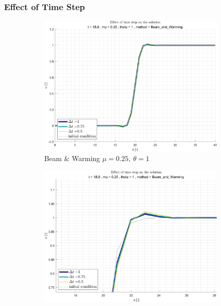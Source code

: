 \documentclass[11pt, a4paper]{article}
\begin{document}
\subsubsection{Effect of Time Step}
\begin{figure}[H]
    \centering
    \begin{subfigure}[c]{.38\textwidth}
        \centering
        \includegraphics[width=\textwidth]{images/grap12.png}
        \caption{Beam $\&$ Warming $\mu=0.25,\ \theta=1$}
        \label{fig:Beam & Warming_general_mu0.25_theta1_A_diff_time}
    \end{subfigure}
    \begin{subfigure}[c]{.38\textwidth}
        \centering
        \includegraphics[width=\textwidth]{images/grap12.1.png}

\end{subfigure}
\end{figure}
\end{document}
